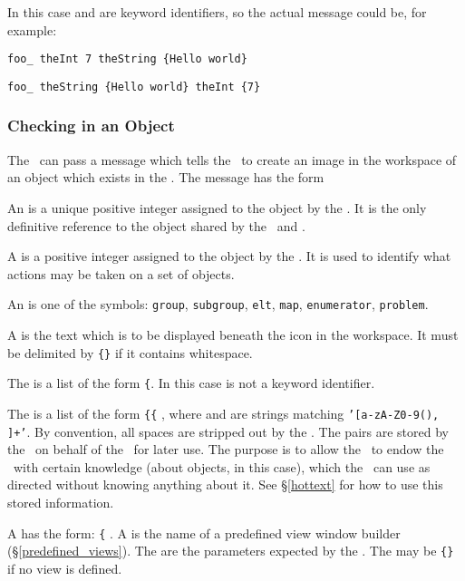 
In this case  and  are keyword
identifiers, so the actual message could be, for example:

{\tt foo\_ theInt 7 theString \{Hello world\}}

{\tt foo\_ theString \{Hello world\} theInt \{7\}}


\subsubsection{Checking in an Object}\label{checking_in}

The \SM\ can pass a message which tells the \FE\ to create an image in
the workspace of an object which exists in the \SM. The message has
the form


An  is a unique positive integer assigned to the object
by the \SM. It is the only definitive reference to the object shared
by the \FE\ and \SM.

A  is a positive integer assigned to the object by the
\SM. It is used to identify what actions may be taken on a set of objects.

An  is one of the symbols: {\tt group}, {\tt subgroup},
{\tt elt}, {\tt map}, {\tt enumerator}, {\tt problem}.

A  is the text which is to be displayed beneath the icon in
the workspace. It must be delimited by {\tt\{\}} if it contains
whitespace.

The  is a list of the form
{\tt\{}. In this case  is not a
keyword identifier.

The  is a list of the form {\tt\{\{}
, where  and  are strings
matching {\tt '[a-zA-Z0-9(), ]+'}.  By convention, all spaces are
stripped out by the \FE.  The  pairs are stored by the
\FE\ on behalf of the \SM\ for later use. The purpose is to allow the
\SM\ to endow the \FE\ with certain knowledge (about objects, in this
case), which the \FE\ can use as directed without knowing anything
about it.  See \S\ref{hottext} for how to use this stored information.

A  has the form: {\tt\{}
.  A  is the name of a
predefined view window builder (\S\ref{predefined_views}). The
 are the parameters expected by the
. The  may be {\tt\{\}} if no view
is defined.

